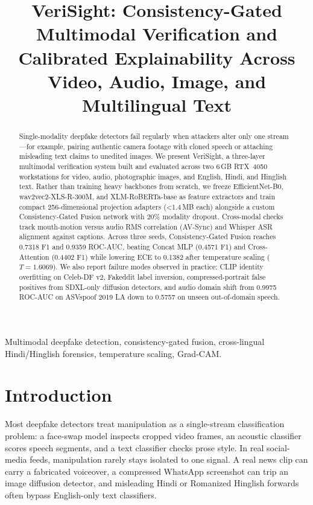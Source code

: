 \documentclass[conference]{IEEEtran}
\begin{document}
\title{VeriSight: Consistency-Gated Multimodal Verification and Calibrated Explainability Across Video, Audio, Image, and Multilingual Text}

\author{
}

\maketitle

\begin{abstract}
Single-modality deepfake detectors fail regularly when attackers alter only one stream—for example, pairing authentic camera footage with cloned speech or attaching misleading text claims to unedited images. We present VeriSight, a three-layer multimodal verification system built and evaluated across two 6\,GB RTX~4050 workstations for video, audio, photographic images, and English, Hindi, and Hinglish text. Rather than training heavy backbones from scratch, we freeze EfficientNet-B0, wav2vec2-XLS-R-300M, and XLM-RoBERTa-base as feature extractors and train compact 256-dimensional projection adapters (<1.4\,MB each) alongside a custom Consistency-Gated Fusion network with 20\% modality dropout. Cross-modal checks track mouth-motion versus audio RMS correlation (AV-Sync) and Whisper ASR alignment against captions. Across three seeds, Consistency-Gated Fusion reaches 0.7318 F1 and 0.9359 ROC-AUC, beating Concat MLP (0.4571 F1) and Cross-Attention (0.4402 F1) while lowering ECE to 0.1382 after temperature scaling ($T = 1.6069$). We also report failure modes observed in practice: CLIP identity overfitting on Celeb-DF v2, Fakeddit label inversion, compressed-portrait false positives from SDXL-only diffusion detectors, and audio domain shift from 0.9975 ROC-AUC on ASVspoof 2019 LA down to 0.5757 on unseen out-of-domain speech.
\end{abstract}

\begin{IEEEkeywords}
Multimodal deepfake detection, consistency-gated fusion, cross-lingual Hindi/Hinglish forensics, temperature scaling, Grad-CAM.
\end{IEEEkeywords}

\section{Introduction}
Most deepfake detectors treat manipulation as a single-stream classification problem: a face-swap model inspects cropped video frames, an acoustic classifier scores speech segments, and a text classifier checks prose style. In real social-media feeds, manipulation rarely stays isolated to one signal. A real news clip can carry a fabricated voiceover, a compressed WhatsApp screenshot can trip an image diffusion detector, and misleading Hindi or Romanized Hinglish forwards often bypass English-only text classifiers.
\end{document}
